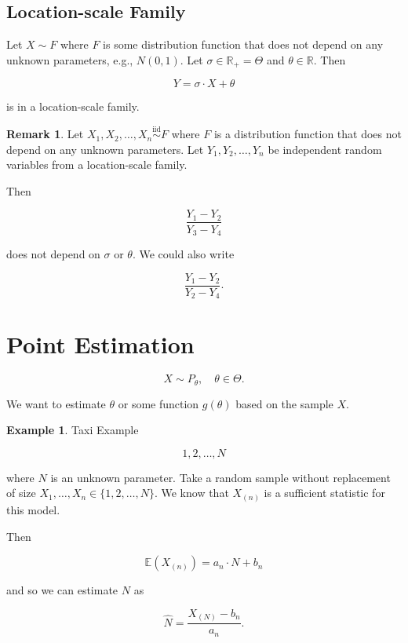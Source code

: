 \documentclass[12pt]{article}
\theoremstyle{definition}
\newtheorem*{example}{Example}
\newtheorem*{remark}{Remark}
\begin{document}
\subsection{Location-scale Family}

Let $X \sim F$ where $F$ is some distribution function that does not depend
on any unknown parameters, e.g., $N(0,1)$. Let $\sigma \in \mathbb{R}_{+} = \Theta$ and
$\theta \in \mathbb{R}$. Then

$$ Y = \sigma \cdot X + \theta $$

is in a location-scale family.

\begin{remark}
Let $X_1, X_2, \ldots, X_n \overset{\text{iid}}{\sim} F$ where $F$ is
a distribution function that does not depend on any unknown parameters.
Let $Y_1, Y_2, \ldots, Y_n$ be independent random variables from a 
location-scale family.

Then

\begin{equation*}
\frac{Y_1 - Y_2}{Y_3 - Y_4}
\end{equation*}

does not depend on $\sigma$ or $\theta$. We could also write

\begin{equation*}
\frac{Y_1 - Y_2}{Y_2 - Y_4}.
\end{equation*}

\end{remark}



\section{Point Estimation}

\begin{equation*}
X \sim P_{\theta}, \quad \theta \in \Theta.
\end{equation*}

We want to estimate $\theta$ or some function $g(\theta)$ based on the
sample $X$.


\begin{example} Taxi Example

$$ 1, 2, \ldots, N$$

where $N$ is an unknown parameter. Take a random sample without
replacement of size $X_1, \ldots, X_n \in \{1, 2, \ldots, N\}$. We
know that $X_{(n)}$ is a sufficient statistic for this model.

Then

$$ \mathbb{E}(X_{(n)}) = a_n \cdot N + b_n $$

and so we can estimate $N$ as

$$ \widehat{N} = \frac{X_{(N)} - b_n}{a_n}.$$
\end{example}
\end{document}
